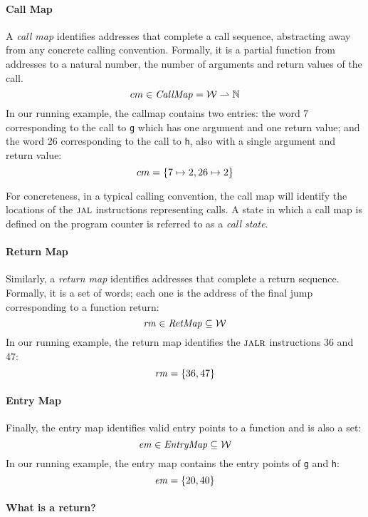\documentclass[acmsmall,review,anonymous]{acmart}\settopmatter{printfolios=true,printccs=false,printacmref=false}
\begin{document}
{\paragraph*{Call Map}

A {\em call map} identifies addresses that complete a call sequence,
abstracting away from any concrete calling convention. Formally, it is
a partial function from addresses to a natural number, the number of
arguments and return values of the call.
\[cm \in \mathit{CallMap} = {\mathcal W} \rightharpoonup \mathbb{N}\]
%
In our running example, the callmap contains two entries: the word 7
corresponding to the call to {\tt g} which has one argument and one
return value; and the word 26 corresponding to the call to {\tt h},
also with a single argument and return value:
\[ cm = \{ 7 \mapsto 2, 26 \mapsto 2\}\]

For concreteness, in a typical calling convention, the call map will
identify the locations of the $\textsc{jal}$ instructions representing calls.
A state in which a call map is defined on the program counter
is referred to as a {\it call state}.

\paragraph*{Return Map}
Similarly, a {\em return map} identifies addresses that complete a
return sequence. Formally, it is a set of words; each one
is the address of the final jump corresponding to a function return:
%
\[\mathit{rm} \in \mathit{RetMap} \subseteq {\mathcal W}\]
%
In our running example, the return map identifies the $\textsc{jalr}$
instructions 36 and 47:
\[ \mathit{rm} = \{36, 47\} \]

\paragraph*{Entry Map}
Finally, the entry map identifies valid entry points to a
function and is also a set:
\[\mathit{em} \in \mathit{EntryMap} \subseteq {\mathcal W}\]
%
In our running example, the entry map contains the entry
points of {\tt g} and {\tt h}:
\[ \mathit{em} = \{20, 40\} \]

\paragraph*{What is a return?}

}
\end{document}
